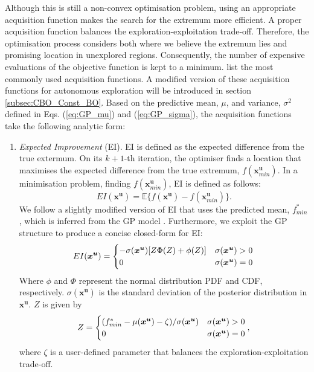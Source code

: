 \documentclass[shortAfour,sageh,times]{sagej_no_sage}
\begin{document}
Although this is still a non-convex optimisation problem, using an appropriate acquisition function makes the search for the extremum more efficient. A proper acquisition function balances the exploration-exploitation trade-off. Therefore, the optimisation process considers both where we believe the extremum lies and promising location in unexplored regions. Consequently, the number of expensive evaluations of the objective function is kept to a minimum. \citet{Brochu2010} list the most commonly used acquisition functions. A modified version of these acquisition functions for autonomous exploration will be introduced in section \ref{subsec:CBO_Const_BO}. Based on the predictive mean, $\mu$, and variance, $\sigma^2$ defined in Eqs. (\ref{eq:GP_mu}) and (\ref{eq:GP_sigma}), the acquisition functions take the following analytic form:
\begin{enumerate}
	\item \textit{Expected Improvement} (EI).
	EI is defined as the expected difference from the true extermum. On its $k+1$-th iteration, the optimiser finds a location that maximises the expected difference from the true extremum, $f(\boldsymbol{x}^{\boldsymbol{u}}_{min})$. In a minimisation problem, finding $f(\boldsymbol{x}^{\boldsymbol{u}}_{min})$, EI is defined as follows: 
	\begin{equation}\label{general_EI_acquisition_function}
		EI(\boldsymbol{x}^{\boldsymbol{u}})= \mathbb{E}\{ f(\boldsymbol{x}^{\boldsymbol{u}}) - f(\boldsymbol{x}^{\boldsymbol{u}}_{min}) \}.
	\end{equation}
	We follow a slightly modified version of EI that uses the predicted mean, $f^*_{min}$, which is inferred from the GP model \citep{Gramacy2011}. Furthermore, we exploit the GP structure to produce a concise closed-form for EI:
	\begin{equation}\label{Expected_Improvement}
		EI(\boldsymbol{x}^{\boldsymbol{u}})=
		\begin{cases}
			-\sigma(\boldsymbol{x}^{\boldsymbol{u}})[Z\Phi(Z)+\phi(Z)] & \text{$\sigma(\boldsymbol{x}^{\boldsymbol{u}}) > 0$}\\
			0 & \text{$\sigma(\boldsymbol{x}^{\boldsymbol{u}})=0$}
		\end{cases}\\
	\end{equation}	
	Where $\phi$ and $\Phi$ represent the normal distribution PDF and CDF, respectively. $\sigma(\boldsymbol{x}^{\boldsymbol{u}})$ is the standard deviation of the posterior distribution in $\boldsymbol{x}^{\boldsymbol{u}}$. $Z$ is given by
    \begin{equation*}
        Z=
	    \begin{cases}
	    (f^*_{min} - \mu(\boldsymbol{x}^{\boldsymbol{u}}) - \zeta)/\sigma(\boldsymbol{x}^{\boldsymbol{u}}) & \text{$\sigma(\boldsymbol{x}^{\boldsymbol{u}}) > 0$}\\
	    0 & \text{$\sigma(\boldsymbol{x}^{\boldsymbol{u}})=0$}
    \end{cases},\\
	\end{equation*}	
	 where $\zeta$ is a user-defined parameter that balances the  exploration-exploitation trade-off.				
	

\end{enumerate}
\end{document}
